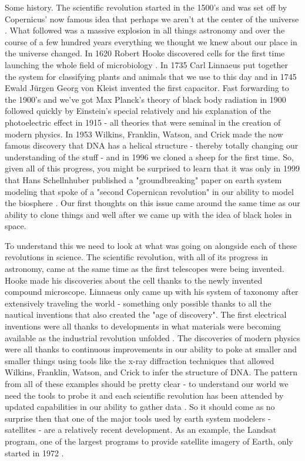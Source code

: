 \documentclass[11pt,a5paper]{book}
\begin{document}
Some history. The scientific revolution started in the 1500's and was set off by Copernicus' now famous idea that perhaps we aren't at the center of the universe \cite{sbrush}. What followed was a massive explosion in all things astronomy and over the course of a few hundred years everything we thought we knew about our place in the universe changed. In 1620 Robert Hooke discovered cells for the first time launching the whole field of microbiology \cite{wsd}. In 1735 Carl Linnaeus put together the system for classifying plants and animals that we use to this day and in 1745 Ewald Jürgen Georg von Kleist invented the first capacitor. Fast forwarding to the 1900's and we've got Max Planck's theory of black body radiation in 1900 followed quickly by Einstein's special relatively and his explanation of the photoelectric effect in 1915 - all theories that were seminal in the creation of modern physics. In 1953 Wilkins, Franklin, Watson, and Crick made the now famous discovery that DNA has a helical structure - thereby totally changing our understanding of the stuff - and in 1996 we cloned a sheep for the first time. So, given all of this progress, you might be surprised to learn that it was only in 1999 that Hans Schellnhuber published a "groundbreaking" paper on earth system modeling that spoke of a "second Copernican revolution" in our ability to model the biosphere \cite{hschellnhuber}. Our first thoughts on this issue came around the same time as our ability to clone things and well after we came up with the idea of black holes in space. 

To understand this we need to look at what was going on alongside each of these revolutions in science. The scientific revolution, with all of its progress in astronomy, came at the same time as the first telescopes were being invented. Hooke made his discoveries about the cell thanks to the newly invented compound microscope. Linnaeus only came up with his system of taxonomy after extensively traveling the world - something only possible thanks to all the nautical inventions that also created the "age of discovery". The first electrical inventions were all thanks to developments in what materials were becoming available as the industrial revolution unfolded \cite{tkuhn}. The discoveries of modern physics were all thanks to continuous improvements in our ability to poke at smaller and smaller things using tools like the x-ray diffraction techniques that allowed Wilkins, Franklin, Watson, and Crick to infer the structure of DNA. The pattern from all of these examples should be pretty clear - to understand our world we need the tools to probe it and each scientific revolution has been attended by updated capabilities in our ability to gather data \cite{tkuhn}. So it should come as no surprise then that one of the major tools used by earth system modelers - satellites - are a relatively recent development. As an example, the Landsat program, one of the largest programs to provide satellite imagery of Earth, only started in 1972 \cite{wls}.
\end{document}

